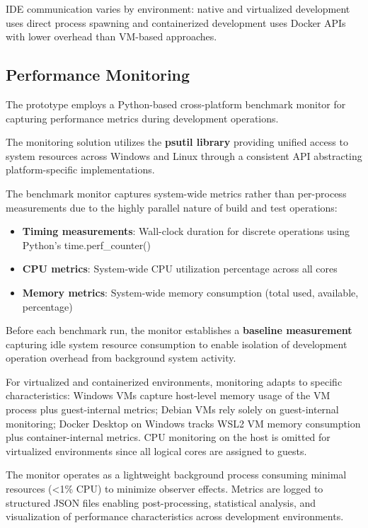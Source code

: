 IDE communication varies by environment: native and virtualized development uses direct process spawning and containerized development uses Docker APIs with lower overhead than VM-based approaches.

\subsection{Performance Monitoring}

The prototype employs a Python-based cross-platform benchmark monitor for capturing performance metrics during development operations.

The monitoring solution utilizes the \textbf{psutil library} providing unified access to system resources across Windows and Linux through a consistent API abstracting platform-specific implementations.

The benchmark monitor captures system-wide metrics rather than per-process measurements due to the highly parallel nature of build and test operations:
\begin{itemize}
\item \textbf{Timing measurements}: Wall-clock duration for discrete operations using Python's time.perf\_counter()
\item \textbf{CPU metrics}: System-wide CPU utilization percentage across all cores
\item \textbf{Memory metrics}: System-wide memory consumption (total used, available, percentage)
\end{itemize}

Before each benchmark run, the monitor establishes a \textbf{baseline measurement} capturing idle system resource consumption to enable isolation of development operation overhead from background system activity.

For virtualized and containerized environments, monitoring adapts to specific characteristics: Windows VMs capture host-level memory usage of the VM process plus guest-internal metrics; Debian VMs rely solely on guest-internal monitoring; Docker Desktop on Windows tracks WSL2 VM memory consumption plus container-internal metrics.
CPU monitoring on the host is omitted for virtualized environments since all logical cores are assigned to guests.

The monitor operates as a lightweight background process consuming minimal resources (<1\% CPU) to minimize observer effects.
Metrics are logged to structured JSON files enabling post-processing, statistical analysis, and visualization of performance characteristics across development environments.


